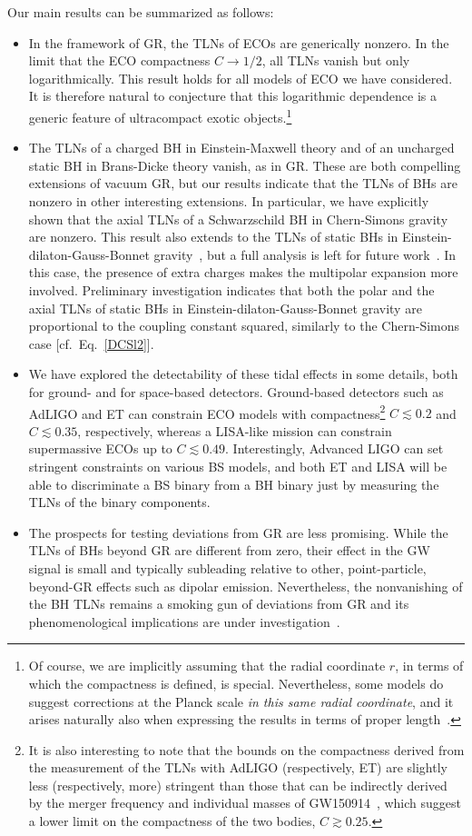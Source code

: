 \documentclass[aps,twocolumn,showpacs,preprintnumbers,nofootinbib,prd,superscriptaddress,groupedaddress,10pt]{revtex4-1}
\begin{document}
Our main results can be summarized as follows:
%
\begin{itemize}
 \item In the framework of GR, the TLNs of ECOs are generically nonzero. In the limit that the ECO compactness $C\to 1/2$, all TLNs vanish but only logarithmically. This result holds for all models of ECO we have considered. It is therefore natural to conjecture that this logarithmic dependence is a generic feature of ultracompact exotic objects.\footnote{Of course, we are implicitly assuming that the radial coordinate $r$, in terms of which the compactness is defined, is special. Nevertheless, some models do suggest corrections at the Planck scale {\it in this same radial coordinate}, and it arises naturally also when expressing the results in terms of proper length~\cite{Holdom:2016nek}.} 
%
 \item The TLNs of a charged BH in Einstein-Maxwell theory and of an uncharged static BH in Brans-Dicke theory vanish, as in GR. 
These are both compelling extensions of vacuum GR, but our results indicate that the TLNs of BHs are nonzero in other interesting extensions. In particular, we have explicitly shown that the axial TLNs of a Schwarzschild BH in Chern-Simons gravity are nonzero. This result also extends to the TLNs of static BHs in Einstein-dilaton-Gauss-Bonnet gravity~\cite{Berti:2015itd}, but a full analysis is left for future work~\cite{inprep}. In this case, the presence of extra charges makes the multipolar expansion more involved. Preliminary investigation indicates that both the polar and the axial TLNs of static BHs in Einstein-dilaton-Gauss-Bonnet gravity are proportional to the coupling constant squared, similarly to the Chern-Simons case [cf.\ Eq.~\eqref{DCSl2}]. 
%
 \item We have explored the detectability of these tidal effects in some details, both for ground- and for space-based detectors. Ground-based detectors such as AdLIGO and ET can constrain ECO models with compactness\footnote{It is also interesting to note that the bounds on the compactness derived from the measurement of the TLNs with AdLIGO (respectively, ET) are slightly less (respectively, more) stringent than those that can be indirectly derived by the merger frequency and individual masses of GW150914~\cite{Abbott:2016blz}, which suggest a lower limit on the compactness of the two bodies, $C\gtrsim0.25$.} $C\lesssim0.2$ and $C\lesssim0.35$, respectively, whereas a LISA-like mission can constrain supermassive ECOs up to $C\lesssim0.49$. Interestingly, Advanced LIGO can set stringent constraints on various BS models, and both ET and LISA will be able to discriminate a BS binary from a BH binary just by measuring the TLNs of the binary components.
 
 
 \item The prospects for testing deviations from GR are less promising. While the TLNs of BHs beyond GR are different from zero, their effect in the GW signal is small and typically subleading relative to other, point-particle, beyond-GR effects such as dipolar emission. Nevertheless, the nonvanishing of the BH TLNs remains a smoking gun of deviations from GR and its phenomenological implications are under investigation~\cite{inprep}.
\end{itemize}
\end{document}
